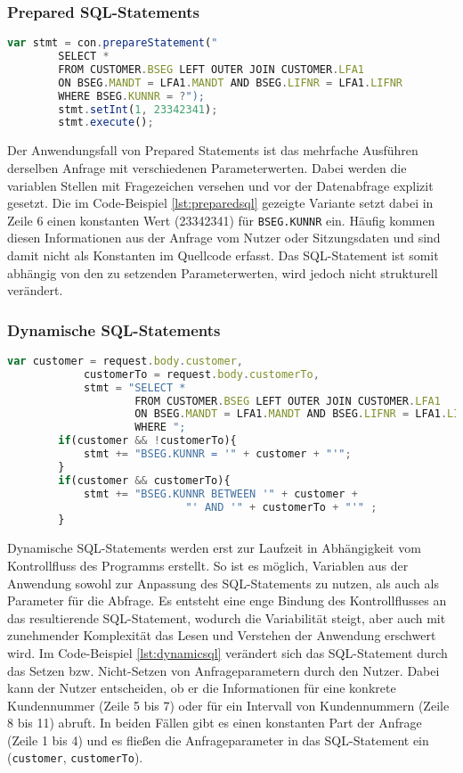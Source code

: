 \clearpage
\subsubsection{Prepared SQL-Statements}

	\begin{lstlisting}[caption={Prepared Statements eingebettet im Quellcode}, label={lst:preparedsql}, language=JavaScript]
		var stmt = con.prepareStatement("
		SELECT *
		FROM CUSTOMER.BSEG LEFT OUTER JOIN CUSTOMER.LFA1
		ON BSEG.MANDT = LFA1.MANDT AND BSEG.LIFNR = LFA1.LIFNR
		WHERE BSEG.KUNNR = ?");
		stmt.setInt(1, 23342341);
		stmt.execute();
	\end{lstlisting}

Der Anwendungsfall von Prepared Statements ist das mehrfache Ausführen derselben Anfrage mit verschiedenen Parameterwerten.
Dabei werden die variablen Stellen mit Fragezeichen versehen und vor der Datenabfrage explizit gesetzt.
Die im Code-Beispiel \ref{lst:preparedsql} gezeigte Variante setzt dabei in Zeile 6 einen konstanten Wert (23342341) für \texttt{BSEG.KUNNR} ein.
Häufig kommen diesen Informationen aus der Anfrage vom Nutzer oder Sitzungsdaten und sind damit nicht als Konstanten im Quellcode erfasst.
Das SQL-Statement ist somit abhängig von den zu setzenden Parameterwerten, wird jedoch nicht strukturell verändert.

\subsubsection{Dynamische SQL-Statements}

	\begin{lstlisting}[caption={Der Kontrollfluss verändert dynamische SQL-Statements}, label={lst:dynamicsql}, language=JavaScript]
		var customer = request.body.customer,
		    customerTo = request.body.customerTo,
		    stmt = "SELECT *
					FROM CUSTOMER.BSEG LEFT OUTER JOIN CUSTOMER.LFA1
					ON BSEG.MANDT = LFA1.MANDT AND BSEG.LIFNR = LFA1.LIFNR
					WHERE ";
		if(customer && !customerTo){
			stmt += "BSEG.KUNNR = '" + customer + "'";
		}
		if(customer && customerTo){
			stmt += "BSEG.KUNNR BETWEEN '" + customer +
							"' AND '" + customerTo + "'" ;
		}
	\end{lstlisting}

Dynamische SQL-Statements werden erst zur Laufzeit in Abhängigkeit vom Kontrollfluss des Programms erstellt.
So ist es möglich, Variablen aus der Anwendung sowohl zur Anpassung des SQL-Statements zu nutzen, als auch als Parameter für die Abfrage.
Es entsteht eine enge Bindung des Kontrollflusses an das resultierende SQL-Statement, wodurch die Variabilität steigt, aber auch mit zunehmender Komplexität das Lesen und Verstehen der Anwendung erschwert wird.
Im Code-Beispiel \ref{lst:dynamicsql} verändert sich das SQL-Statement durch das Setzen bzw. Nicht-Setzen von Anfrageparametern durch den Nutzer.
Dabei kann der Nutzer entscheiden, ob er die Informationen für eine konkrete Kundennummer (Zeile 5 bis 7) oder für ein Intervall von Kundennummern (Zeile 8 bis 11) abruft.
In beiden Fällen gibt es einen konstanten Part der Anfrage (Zeile 1 bis 4) und es fließen die Anfrageparameter in das SQL-Statement ein (\texttt{customer}, \texttt{customerTo}).

